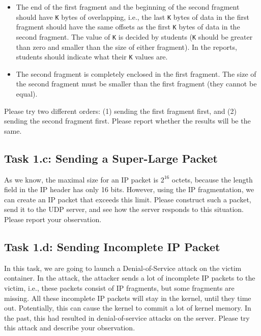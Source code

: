  \begin{itemize} 
 \item The end of the first fragment and the beginning of the second
 fragment should have \texttt{K} bytes of overlapping, i.e., the last  
 \texttt{K} bytes of data in the first fragment should have the same
 offsets as the first \texttt{K} bytes of data in the second fragment. 
 The value of \texttt{K} is decided by students (\texttt{K} should be 
 greater than zero and smaller than the size of either fragment). In the reports, students
 should indicate what their \texttt{K} values are. 


 \item The second fragment is completely enclosed in the first fragment.
 The size of the second fragment must be smaller than the 
 first fragment (they cannot be equal).

 \end{itemize} 


Please try two different orders: (1) sending the first fragment first, and 
(2) sending the second fragment first. Please report whether the results will
be the same. 





\subsection{Task 1.c: Sending a Super-Large Packet}

As we know, the maximal size for an IP packet is $2^{16}$ octets, because
the length field in the IP header has only 16 bits. 
However,
using the IP fragmentation, we can create an IP packet that 
exceeds this limit. Please construct such a packet, send
it to the UDP server, and see how the server responds to this 
situation. Please report your observation. 
  



\subsection{Task 1.d: Sending Incomplete IP Packet}


In this task, we are going to launch a Denial-of-Service attack 
on the victim container. In the attack, the attacker sends  a lot of 
incomplete IP packets to the victim, i.e., these packets consist of 
IP fragments, but some fragments are missing. All these incomplete IP packets 
will stay in the kernel, until they time out. Potentially, this can
cause the kernel to commit a lot of kernel memory. In the past, this 
had resulted in denial-of-service attacks on the server. Please try 
this attack and describe your observation. 




